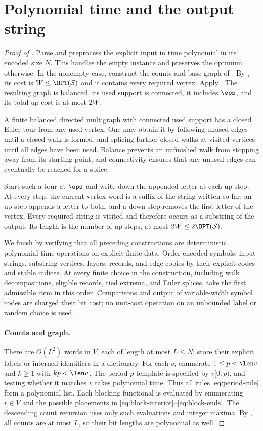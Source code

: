 \section{Polynomial time and the output string}\label{sec:algorithm}

\begin{proof}[Proof of ]
Parse and preprocess the explicit input in time polynomial in its encoded size $N$. This handles the empty instance and preserves the optimum otherwise. In the nonempty case, construct the counts and base graph of . By , its cost is $W\le\OPT(\mathcal S)$ and it contains every required vertex. Apply . The resulting graph is balanced, its used support is connected, it includes $\eps$, and its total up cost is at most $2W$.

A finite balanced directed multigraph with connected used support has a closed Euler tour from any used vertex. One may obtain it by following unused edges until a closed walk is formed, and splicing further closed walks at visited vertices until all edges have been used. Balance prevents an unfinished walk from stopping away from its starting point, and connectivity ensures that any unused edges can eventually be reached for a splice.

Start such a tour at $\eps$ and write down the appended letter at each up step. At every step, the current vertex word is a suffix of the string written so far: an up step appends a letter to both, and a down step removes the first letter of the vertex. Every required string is visited and therefore occurs as a substring of the output. Its length is the number of up steps, at most $2W\le2\OPT(\mathcal S)$.

We finish by verifying that all preceding constructions are deterministic polynomial-time operations on explicit finite data. Order encoded symbols, input strings, substring vertices, layers, records, and edge copies by their explicit codes and stable indices. At every finite choice in the construction, including walk decompositions, eligible records, tied extrema, and Euler splices, take the first admissible item in this order. Comparisons and output of variable-width symbol codes are charged their bit cost; no unit-cost operation on an unbounded label or random choice is used.

\paragraph{Counts and graph.}
There are $O(L^2)$ words in $V$, each of length at most $L\le N$; store their explicit labels or interned identifiers in a dictionary. For each $v$, enumerate $1\le p<\len v$ and $k\ge1$ with $kp<\len v$. The period-$p$ template is specified by $v[0:p)$, and testing whether it matches $v$ takes polynomial time. Thus all rules \eqref{eq:period-rule} form a polynomial list. Each blocking functional is evaluated by enumerating $r\in V$ and the possible placements in \eqref{eq:block-interior}--\eqref{eq:block-ends}. The descending count recursion uses only such evaluations and integer maxima. By , all counts are at most $L$, so their bit lengths are polynomial as well.


\end{proof}
